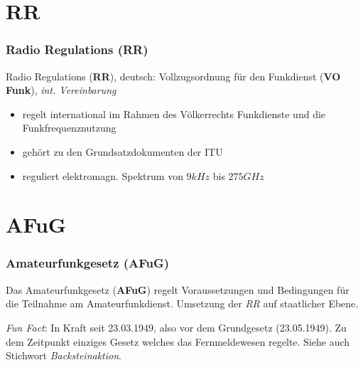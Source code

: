 \section{RR}

\begin{frame}
    \frametitle{Radio Regulations (RR)}
    
    Radio Regulations (\textbf{RR}), deutsch: Vollzugsordnung für den Funkdienst
    (\textbf{VO Funk}), \emph{int. Vereinbarung}

    \begin{itemize}
        \item regelt international im Rahmen des Völkerrechts Funkdienste und
              die Funkfrequenznutzung
        \item gehört zu den Grundsatzdokumenten der ITU
        \item reguliert elektromagn. Spektrum von $9kHz$ bis $275GHz$
    \end{itemize}

\end{frame}

\section{AFuG}

\begin{frame}
    \frametitle{Amateurfunkgesetz (AFuG)}

    Das Amateurfunkgesetz (\textbf{AFuG}) regelt Voraussetzungen und Bedingungen
    für die Teilnahme am Amateurfunkdienst. Umsetzung der \emph{RR} auf
    staatlicher Ebene.

    \emph{Fun Fact}: In Kraft seit 23.03.1949, also vor dem Grundgesetz
    (23.05.1949). Zu dem Zeitpunkt einziges Gesetz welches das Fernmeldewesen
    regelte. Siehe auch Stichwort \emph{Backsteinaktion}.

\end{frame}

